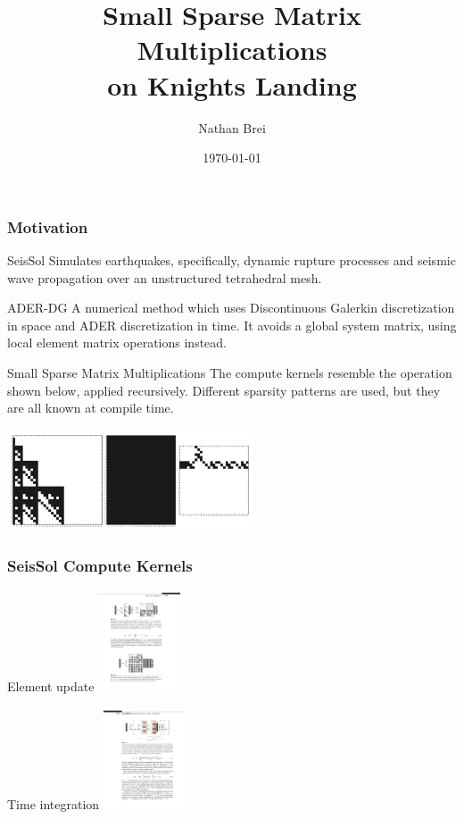 \documentclass[9pt]{beamer}
\title{Small Sparse Matrix Multiplications\\ on Knights Landing}
\author{Nathan Brei}
\institute{Technical University of Munich}
\date\today
\begin{document}
\begin{frame}
  \titlepage
\end{frame}



\begin{frame}
  \frametitle{Motivation}
  
  \begin{block}{SeisSol}
    Simulates earthquakes, specifically, dynamic rupture processes and seismic wave propagation over an unstructured tetrahedral mesh. 
  \end{block}

  \begin{block}{ADER-DG}
    A numerical method which uses Discontinuous Galerkin discretization in space and ADER discretization in time. It avoids a global system matrix, using local element matrix operations instead.
  \end{block}

  \begin{block}{Small Sparse Matrix Multiplications}
    The compute kernels resemble the operation shown below, applied recursively. Different sparsity patterns are used, but they are all known at compile time.
  \end{block}

  \centering
  \includegraphics[height=3cm]{images/seissol_visc.png}

\end{frame}

\begin{frame}
  \frametitle{SeisSol Compute Kernels}
  \begin{block}{Element update}
  \centering
  \includegraphics[height=3cm]{images/seissol_elem.pdf}
  \end{block}
  \begin{block}{Time integration}
  \centering
  \includegraphics[height=3cm]{images/seissol_ader.pdf}
  \end{block}

\end{frame}
\end{document}
